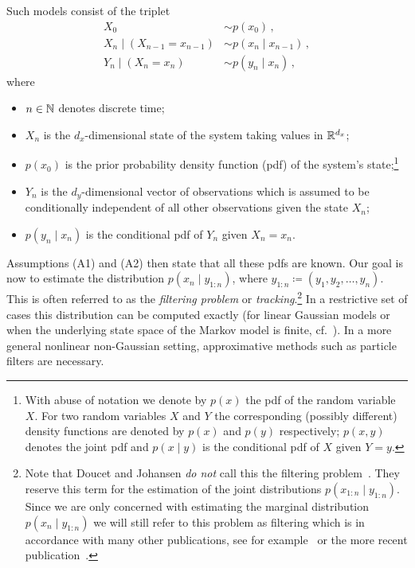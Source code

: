 Such models consist of the triplet
\begin{align*}
  \label{eq:hmm:1}
  X_0 &\sim p(x_0)\,,\\
  X_n \mid (X_{n-1} = x_{n-1}) &\sim p(x_n \mid x_{n-1})\,,\\
  Y_n \mid (X_n = x_n) &\sim p(y_n \mid x_n) \,,
\end{align*}
where
\begin{itemize}
\item $n \in \mathbb{N}$ denotes discrete time;
\item $X_n$ is the $d_x$-dimensional state of the system taking values
  in $\mathbb{R}^{d_x}$;
\item $p(x_0)$ is the prior probability density function (pdf) of the
  system's state;\footnote{ With abuse of notation we denote by $p(x)$
    the pdf of the random variable $X$. For two random variables $X$
    and $Y$ the corresponding (possibly different) density functions
    are denoted by $p(x)$ and $p(y)$ respectively; $p(x,y)$ denotes
    the joint pdf and $p(x \mid y)$ is the conditional pdf of $X$
    given $Y = y$.}
\item $Y_n$ is the $d_y$-dimensional vector of observations which is
  assumed to be conditionally independent of all other observations
  given the state $X_n$;
\item $p(y_n \mid x_n)$ is the conditional pdf of $Y_n$ given
  $X_n = x_n$.
\end{itemize}
Assumptions (A1) and (A2) then state that all these pdfs are known.
Our goal is now to estimate the distribution $p(x_n \mid y_{1:n})$,
where $y_{1:n} \coloneqq (y_1, y_2, \dotsc, y_n)$. This is often
referred to as the \emph{filtering problem} or
\emph{tracking}.\footnote{Note that Doucet and Johansen \emph{do not}
  call this the filtering problem~\cite{doucet}. They reserve this
  term for the estimation of the joint distributions
  $p(x_{1:n} \mid y_{1:n} )$. Since we are only concerned with
  estimating the marginal distribution $p(x_n \mid y_{1:n} )$ we will
  still refer to this problem as filtering which is in accordance with
  many other publications, see for example~\cite{arulampalam, Doucet2000} or
  the more recent publication~\cite{murray}.}  In a restrictive set of
cases this distribution can be computed exactly (\eg for linear
Gaussian models or when the underlying state space of the Markov model
is finite, cf.~\cite[Example 1 and 2]{doucet}). In a more general
nonlinear non-Gaussian setting, approximative methods such as particle
filters are necessary.
